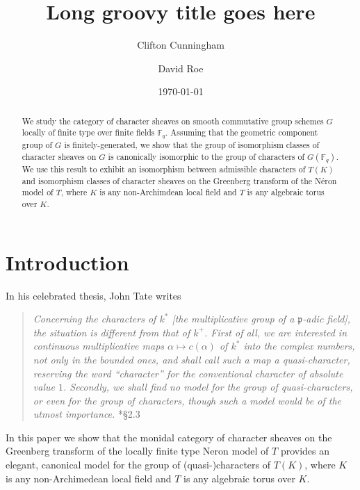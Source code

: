 \documentclass[11pt]{amsart}
\title[Short groovy title goes here]{Long groovy title goes here}
\date{\today}
\author{Clifton Cunningham}
\author{David Roe}
\theoremstyle{plain}
\theoremstyle{definition}
\theoremstyle{remark}
\begin{document}
\begin{abstract}
  We study the category of character sheaves on smooth commutative
  group schemes $G$ locally of finite type over finite fields
  $\mathbb{F}_q$. Assuming that the geometric component group of $G$
  is finitely-generated, we show that the group of isomorphism classes
  of character sheaves on $G$ is canonically isomorphic to the group
  of characters of $G(\mathbb{F}_q)$. We use this result to exhibit an
  isomorphism between admissible characters of $T(K)$ and isomorphism
  classes of character sheaves on the Greenberg transform of the Néron
  model of $T$, where $K$ is any non-Archimdean local field and $T$ is
  any algebraic torus over $K$.
\end{abstract}

\maketitle

\section{Introduction}

%
In his celebrated thesis, John Tate writes 
\begin{quotation}
    {\it Concerning the characters of $k^*$ [the
    multiplicative group of a $\mathfrak{p}$-adic field], the
    situation is different from that of $k^+$.  First of all, we are
    interested in continuous multiplicative maps $\alpha \mapsto
    c(\alpha)$ of $k^*$ into the complex numbers, not only in the
    bounded ones, and shall call such a map a quasi-character,
    reserving the word ``character'' for the conventional character of
    absolute value $1$. Secondly, we shall find no model for the group
    of quasi-characters, or even for the group of characters, though
    such a model would be of the utmost importance.}
  \cite{Tate:thesis}*{\S 2.3}
\end{quotation}
\noindent
In this paper we show that the monidal category of character sheaves
on the Greenberg transform of the locally finite type Neron model of
$T$ provides an elegant, canonical model for the group of
(quasi-)characters of $T(K)$, where $K$ is any non-Archimedean local
field and $T$ is any algebraic torus over $K$.
\end{document}
